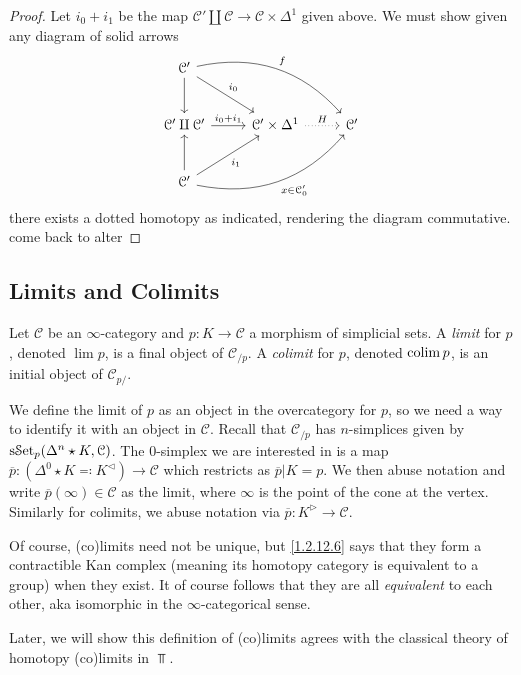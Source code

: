 \begin{proof}
	Let $i_0+i_1$ be the map $\mathcal{C} '\amalg \mathcal{C} \to \mathcal{C} \times \Delta ^1$ given above. We must show given any diagram of solid arrows
	\[\begin{tikzcd}[row sep = 2.5em, column sep = 2.5em]
	\mathcal{C} '\ar[" f ", bend left, drr] \ar[" i_0 ", dr] \ar[d]  &  &  \\
	\mathcal{C} '\amalg \mathcal{C} ' \ar[" i_0+i_1 ", r]  & \mathcal{C} '\times \Delta ^1\ar[" H ", dotted, r]  & \mathcal{C} ' \\
	\mathcal{C} '\ar[" x\in \mathcal{C} '_0 "', bend right, urr] \ar[" i_1 "', ur] \ar[u] &  & 
	\end{tikzcd}\]
	there exists a dotted homotopy as indicated, rendering the diagram commutative. come back to alter
\end{proof}


\subsection{Limits and Colimits}

\begin{definition}\label{1.2.13.1}
	Let $\mathcal{C} $ be an $\infty $-category and $p : K \to \mathcal{C} $ a morphism of simplicial sets. A \emph{limit} for $p$, denoted $\lim p$, is a final object of $\mathcal{C} _{/p} $. A \emph{colimit} for $p$, denoted $\operatorname*{colim} p$, is an initial object of $\mathcal{C} _{p/} $.
\end{definition}

We define the limit of $p$ as an object in the overcategory for $p$, so we need a way to identify it with an object in $\mathcal{C} $. Recall that $\mathcal{C} _{/p} $ has $n$-simplices given by $\mathrm{s}\mathcal{S}\mathrm{et} _p(\Delta ^n\star K,\mathcal{C} )$. The $0$-simplex we are interested in is a map $\overline{p} : (\Delta ^0 \star K \eqqcolon K^{\lhd} ) \to \mathcal{C} $ which restricts as $\overline{p}|K=p$. We then abuse notation and write $\overline{p} (\infty )\in \mathcal{C} $ as the limit, where $\infty $ is the point of the cone at the vertex. Similarly for colimits, we abuse notation via $\overline{p} : K^{\triangleright}  \to \mathcal{C} $.

Of course, (co)limits need not be unique, but \cref{1.2.12.6} says that they form a contractible Kan complex (meaning its homotopy category is equivalent to a group) when they exist. It of course follows that they are all \emph{equivalent} to each other, aka isomorphic in the $\infty $-categorical sense.

Later, we will show this definition of (co)limits agrees with the classical theory of homotopy (co)limits in $\Top $.


